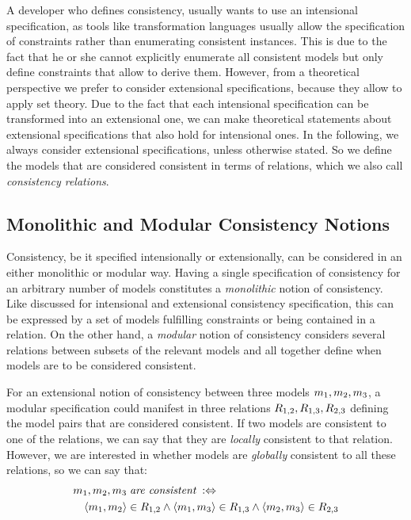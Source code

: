 A developer who defines consistency, usually wants to use an intensional specification, as tools like transformation languages usually allow the specification of constraints rather than enumerating consistent instances. This is due to the fact that he or she cannot explicitly enumerate all consistent models but only define constraints that allow to derive them.
However, from a theoretical perspective we prefer to consider extensional specifications, because they allow to apply set theory.
Due to the fact that each intensional specification can be transformed into an extensional one, we can make theoretical statements about extensional specifications that also hold for intensional ones.
In the following, we always consider extensional specifications, unless otherwise stated.
So we define the models that are considered consistent in terms of relations, which we also call \emph{\glspl{consistency relation}}.


\subsection{Monolithic and Modular Consistency Notions}

Consistency, be it specified intensionally or extensionally, can be considered in an either monolithic or modular way.
Having a single specification of consistency for an arbitrary number of models constitutes a \emph{monolithic} notion of consistency.
Like discussed for intensional and extensional consistency specification, this can be expressed by a set of models fulfilling constraints or being contained in a relation.
On the other hand, a \emph{modular} notion of consistency considers several relations between subsets of the relevant models and all together define when models are to be considered consistent.

For an extensional notion of consistency between three models $m_{1}, m_{2}, m_{3}$, a modular specification could manifest in three relations $R_{1,2}, R_{1,3}, R_{2,3}$ defining the model pairs that are considered consistent.
If two models are consistent to one of the relations, we can say that they are \emph{locally} consistent to that relation.
However, we are interested in whether models are \emph{globally} consistent to all these relations, so we can say that:
\begin{align*}
    & m_{1}, m_{2}, m_{3} \; \textit{are consistent} \; :\Leftrightarrow \\
    & \hspace{1em} 
    \langle m_{1},m_{2} \rangle \in R_{1,2} \land \langle m_{1},m_{3} \rangle \in R_{1,3} \land \langle m_{2},m_{3} \rangle \in R_{2,3}
\end{align*}

